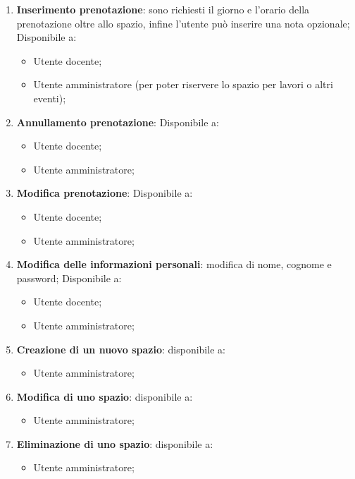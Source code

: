 \begin{enumerate}
	\item \textbf{Inserimento prenotazione}:
	      sono richiesti il giorno e l'orario della prenotazione oltre allo
	      spazio, infine l'utente può inserire una nota opzionale; Disponibile
	      a:
	      \begin{itemize}
		      \item Utente docente;
		      \item Utente amministratore (per poter riservere lo spazio per lavori o altri eventi);
	      \end{itemize}

	\item \textbf{Annullamento prenotazione}:
	      Disponibile a:
	      \begin{itemize}
		      \item Utente docente;
		      \item Utente amministratore;
	      \end{itemize}

	\item \textbf{Modifica prenotazione}: Disponibile a:
	      \begin{itemize}
		      \item Utente docente;
		      \item Utente amministratore;
	      \end{itemize}

	\item \textbf{Modifica delle informazioni personali}: modifica di nome,
	      cognome e password;
	      Disponibile a:
	      \begin{itemize}
		      \item Utente docente;
		      \item Utente amministratore;
	      \end{itemize}

	\item \textbf{Creazione di un nuovo spazio}: disponibile a:
	      \begin{itemize}
		      \item Utente amministratore;
	      \end{itemize}

	\item \textbf{Modifica di uno spazio}: disponibile a:
	      \begin{itemize}
		      \item Utente amministratore;
	      \end{itemize}

	\item \textbf{Eliminazione di uno spazio}: disponibile a:
	      \begin{itemize}
		      \item Utente amministratore;
	      \end{itemize}


\end{enumerate}
